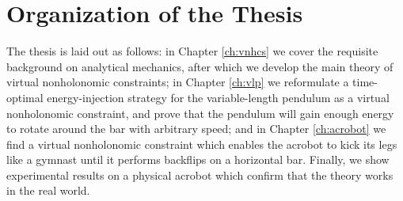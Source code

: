 \section{Organization of the Thesis}
The thesis is laid out as follows: 
in Chapter \ref{ch:vnhcs} we cover the requisite background on analytical 
mechanics, after which we develop the main theory of virtual nonholonomic
constraints;
in Chapter \ref{ch:vlp} we reformulate a time-optimal energy-injection strategy
for the variable-length pendulum as a virtual nonholonomic constraint, and
prove that the pendulum will gain enough energy to rotate around the bar with
arbitrary speed;
and in Chapter \ref{ch:acrobot} we find a virtual nonholonomic constraint 
which enables the acrobot to kick its legs like a gymnast until it
performs backflips on a horizontal bar.
Finally, we show experimental results on a physical acrobot which confirm
that the theory works in the real world.

